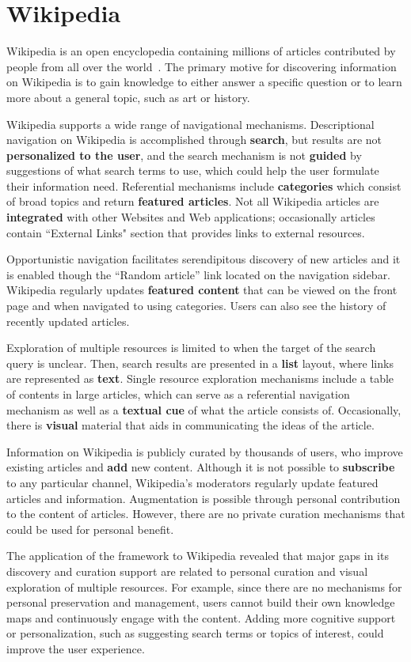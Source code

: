 {\section{Wikipedia}
Wikipedia is an open encyclopedia containing millions of articles contributed by people from all over the world~\cite{kittur2007power,volkel2006semantic}. The primary motive for discovering information on Wikipedia is to gain knowledge to either answer a specific question or to learn more about a general topic, such as art or history.

\pagebreak

Wikipedia supports a wide range of navigational mechanisms. Descriptional navigation on Wikipedia is accomplished through \textbf{search}, but results are not \textbf{personalized to the user}, and the search mechanism is not \textbf{guided} by suggestions of what search terms to use, which could help the user formulate their information need. Referential mechanisms include \textbf{categories} which consist of broad topics and return \textbf{featured articles}. Not all Wikipedia articles are \textbf{integrated} with other Websites and Web applications; occasionally articles contain ``External Links" section that provides links to external resources. 

Opportunistic navigation facilitates serendipitous discovery of new articles and it is enabled though the ``Random article'' link located on the navigation sidebar. Wikipedia regularly updates \textbf{featured content} that can be viewed on the front page and when navigated to using categories. Users can also see the history of recently updated articles. 

Exploration of multiple resources is limited to when the target of the search query is unclear. Then, search results are presented in a \textbf{list} layout, where links are represented as \textbf{text}. Single resource exploration mechanisms include a table of contents in large articles, which can serve as a referential navigation mechanism as well as a \textbf{textual cue} of what the article consists of. Occasionally, there is \textbf{visual} material that aids in communicating the ideas of the article.  

Information on Wikipedia is publicly curated by thousands of users, who improve existing articles and \textbf{add} new content. Although it is not possible to \textbf{subscribe} to any particular channel, Wikipedia's moderators regularly update featured articles and information. Augmentation is possible through personal contribution to the content of articles. However, there are no private curation mechanisms that could be used for personal benefit. 

The application of the framework to Wikipedia revealed that major gaps in its discovery and curation support are related to personal curation and visual exploration of multiple resources. For example, since there are no mechanisms for personal preservation and management, users cannot build their own knowledge maps and continuously engage with the content. Adding more cognitive support or personalization, such as suggesting search terms or topics of interest, could improve the user experience.

} %


